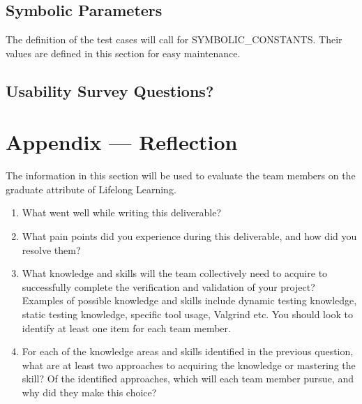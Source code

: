 \documentclass[12pt, titlepage]{article}
\begin{document}
\subsection{Symbolic Parameters}

The definition of the test cases will call for SYMBOLIC\_CONSTANTS.
Their values are defined in this section for easy maintenance.

\subsection{Usability Survey Questions?}


\newpage{}
\section*{Appendix --- Reflection}


The information in this section will be used to evaluate the team members on the
graduate attribute of Lifelong Learning.



\begin{enumerate}
  \item What went well while writing this deliverable? 
  \item What pain points did you experience during this deliverable, and how
    did you resolve them?
  \item What knowledge and skills will the team collectively need to acquire to
  successfully complete the verification and validation of your project?
  Examples of possible knowledge and skills include dynamic testing knowledge,
  static testing knowledge, specific tool usage, Valgrind etc.  You should look to
  identify at least one item for each team member.
  \item For each of the knowledge areas and skills identified in the previous
  question, what are at least two approaches to acquiring the knowledge or
  mastering the skill?  Of the identified approaches, which will each team
  member pursue, and why did they make this choice?
\end{enumerate}
\end{document}
